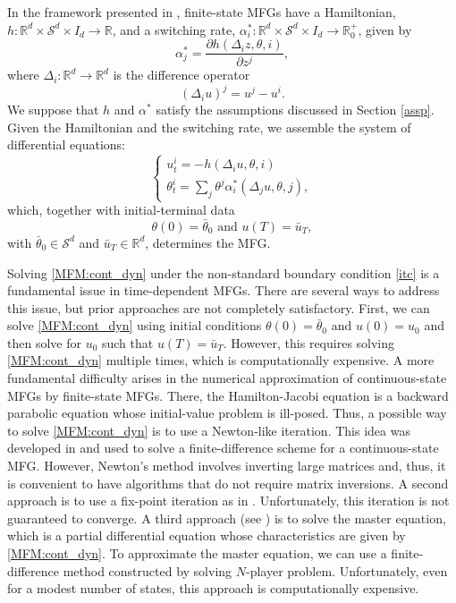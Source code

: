 \documentclass[12pt]{amsart}
\newcommand{\Rr}{{\mathbb{R}}}
\newcommand{\1}{{\chi}}
\newcommand{\Ss}{\mathcal{S}}
\theoremstyle{definition}
\begin{document}
       In the framework presented in \cite{GMS}, finite-state MFGs have   a Hamiltonian, $h:\Rr^d\times \Ss^d\times I_d\to \Rr$, and a switching rate, $\alpha^*_i:\Rr^d\times \Ss^d\times I_d\to \Rr_0^+$, given by
        \begin{equation}
                \label{alfstar2}
                \alpha^*_j=\frac{\partial h(\Delta_iz,\theta,i) }{\partial z^j}, 
        \end{equation}
        where $\Delta_i:\Rr^d\to \Rr^d$ is the difference operator
        \[
                (\Delta_i u)^j=u^j-u^i.
        \]
        We suppose that $h$ and $\alpha^*$ satisfy the assumptions discussed in Section \ref{assp}. Given the Hamiltonian and the switching rate, 
        we assemble the system of differential equations:
        \begin{equation} \label{MFM:cont_dyn}
        \begin{cases}
        u_t^i = -h(\Delta_i u,\theta,i)\\
        \theta_t^i=\sum_j \theta^j \alpha^*_i(\Delta_j u, \theta, j), 
        \end{cases}
        \end{equation}
        which, together with initial-terminal data
        \begin{equation}
        \label{itc}
        \theta(0) = \bar \theta_0 \text{ and } u(T)=\bar u_T, 
        \end{equation}
        with $\bar \theta_0\in \Ss^d$ and $\bar u_T\in \Rr^d$, determines the MFG. 


Solving \eqref{MFM:cont_dyn} under
the non-standard boundary condition \eqref{itc} 
is a fundamental issue in time-dependent MFGs.
There are several ways to address this issue, but 
prior approaches are not completely satisfactory. 
First, we can solve \eqref{MFM:cont_dyn} using initial conditions
$\theta(0)=\bar \theta_0$ and $u(0)=u_0$ and then solve for $u_0$ 
such that $u(T)=\bar u_T$. 
However, this requires solving \eqref{MFM:cont_dyn} multiple times, which is computationally expensive. A more fundamental difficulty 
arises in the numerical approximation 
of continuous-state MFGs by finite-state MFGs. There, 
the Hamilton-Jacobi equation is a backward parabolic equation 
whose initial-value problem is ill-posed. Thus, a possible way 
to solve \eqref{MFM:cont_dyn} is to use a Newton-like iteration. This idea
was developed in \cite{achdou2013finite, MR2928376} and used to solve
a finite-difference scheme for a continuous-state MFG. However, Newton's method involves inverting large matrices and, thus, it is convenient to have 
algorithms that do not require matrix inversions.  
A second approach is to use a fix-point iteration as in \cite{MR3392626,MR3148086}. Unfortunately, 
this iteration is not guaranteed to converge. 
A third approach (see \cite{GVW-dual,Gomes:2014kq}) is to
solve the master equation, which is a partial differential equation  whose characteristics are given by \eqref{MFM:cont_dyn}. 
To approximate the master equation, 
we can use a finite-difference method constructed by solving $N$-player problem. Unfortunately, even for a modest number of states, this approach 
is computationally expensive. 
\end{document}
